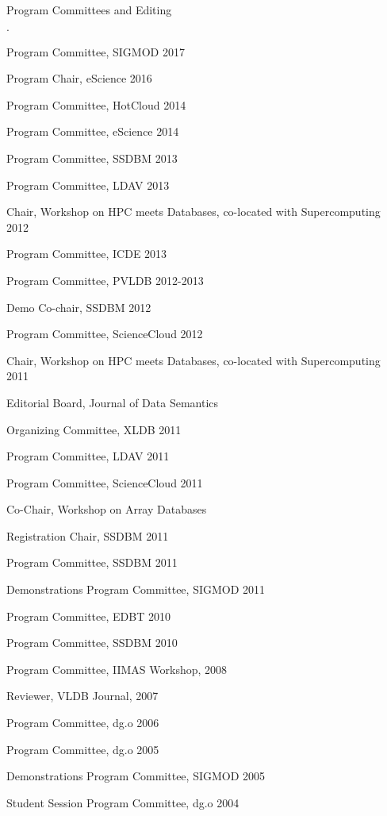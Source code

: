 \documentclass[10pt]{article}
\newenvironment{bulletlist}
   {
      \begin{list}
         {$\cdot$}
         {
            \setlength{\itemsep}{.5ex}
            \setlength{\parsep}{0ex}
            \setlength{\leftmargin}{0.7em}
            \setlength{\parskip}{0ex}
            \setlength{\topsep}{0ex}
         }
   }
   {
      \end{list}
   }
\newcommand{\marginlabel}[1]{
\begin{minipage}[b]{0.8\labelwidth}{\large \textsf{\textbf{#1}}}\end{minipage}}
\newcommand{\entrylabel}[1]{\mbox{\marginlabel{#1}}\hfill}
\newcommand{\MainListlabel}[1]
   {
      \parbox[t]{\labelwidth}{\hspace{.8em}\marginlabel{#1}}
   }
\newenvironment{MainList}[1]
   {
      \renewcommand{\entrylabel}{\MainListlabel}
      \begin{list}{}
      {
         \renewcommand{\makelabel}{\entrylabel}
         \setlength   {\itemindent}{-.65em}
         \setlength   {\labelwidth}{#1}
         \setlength   {\leftmargin}{\labelwidth}
         \setlength   {\itemsep}{3ex}
      }
   }
   {
      \end{list}
   }
\begin{document}
\begin{MainList}{88pt}
\item [Program Committees and Editing]
\begin{bulletlist}
\item Program Committee, SIGMOD 2017
\item Program Chair, eScience 2016
\item Program Committee, HotCloud 2014
\item Program Committee, eScience 2014
\item Program Committee, SSDBM 2013
\item Program Committee, LDAV 2013
\item Chair, Workshop on HPC meets Databases, co-located with Supercomputing 2012
\item Program Committee, ICDE 2013
\item Program Committee, PVLDB 2012-2013
\item Demo Co-chair, SSDBM 2012
\item Program Committee, ScienceCloud 2012
\item Chair, Workshop on HPC meets Databases, co-located with Supercomputing 2011
\item Editorial Board, Journal of Data Semantics
\item Organizing Committee, XLDB 2011
\item Program Committee, LDAV 2011
\item Program Committee, ScienceCloud 2011
\item Co-Chair, Workshop on Array Databases
\item Registration Chair, SSDBM 2011
\item Program Committee, SSDBM 2011
\item Demonstrations Program Committee, SIGMOD 2011
\item Program Committee, EDBT 2010
\item Program Committee, SSDBM 2010
\item Program Committee, IIMAS Workshop, 2008
\item Reviewer, VLDB Journal, 2007
\item Program Committee, dg.o 2006
\item Program Committee, dg.o 2005
\item Demonstrations Program Committee, SIGMOD 2005
\item Student Session Program Committee, dg.o 2004
\end{bulletlist}



\end{MainList}
\end{document}
